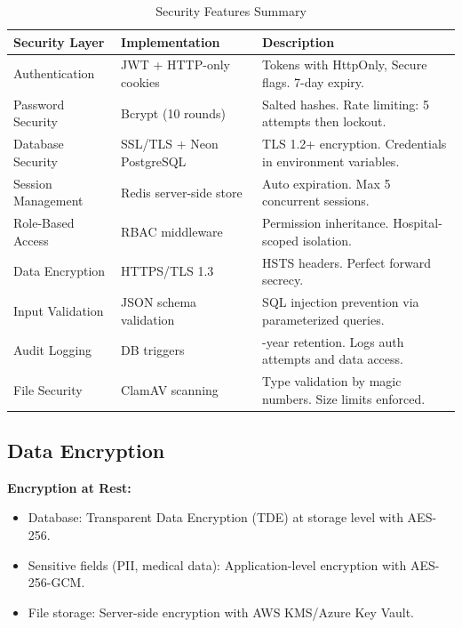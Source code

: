 \begin{table}[H]
    \small
    \centering
    \renewcommand{\arraystretch}{1.3}
    \begin{tabular}{|>{\raggedright\arraybackslash}p{2.8cm}|>{\raggedright\arraybackslash}p{3.8cm}|>{\raggedright\arraybackslash}p{6.8cm}|}
        \hline
        \textbf{Security Layer} & \textbf{Implementation} & \textbf{Description} \\
        \hline
        Authentication
            & JWT + HTTP-only cookies
            & Tokens with HttpOnly, Secure flags. 7-day expiry. \\
        \hline
        Password Security
            & Bcrypt (10 rounds)
            & Salted hashes. Rate limiting: 5 attempts then lockout. \\
        \hline
        Database Security
            & SSL/TLS + Neon PostgreSQL
            & TLS 1.2+ encryption. Credentials in environment variables. \\
        \hline
        Session Management
            & Redis server-side store
            & Auto expiration. Max 5 concurrent sessions. \\
        \hline
        Role-Based Access
            & RBAC middleware
            & Permission inheritance. Hospital-scoped isolation. \\
        \hline
        Data Encryption
            & HTTPS/TLS 1.3
            & HSTS headers. Perfect forward secrecy. \\
        \hline
        Input Validation
            & JSON schema validation
            & SQL injection prevention via parameterized queries. \\
        \hline
        Audit Logging
            & DB triggers
            & 7-year retention. Logs auth attempts and data access. \\
        \hline
        File Security
            & ClamAV scanning
            & Type validation by magic numbers. Size limits enforced. \\
        \hline
    \end{tabular}
    \caption{Security Features Summary}
    \label{tab:ch4-security}
\end{table}

\subsection{Data Encryption}

\textbf{Encryption at Rest:}
\begin{itemize}
    \item Database: Transparent Data Encryption (TDE) at storage level with AES-256.
    \item Sensitive fields (PII, medical data): Application-level encryption with
    AES-256-GCM.
    \item File storage: Server-side encryption with AWS KMS/Azure Key Vault.
\end{itemize}

